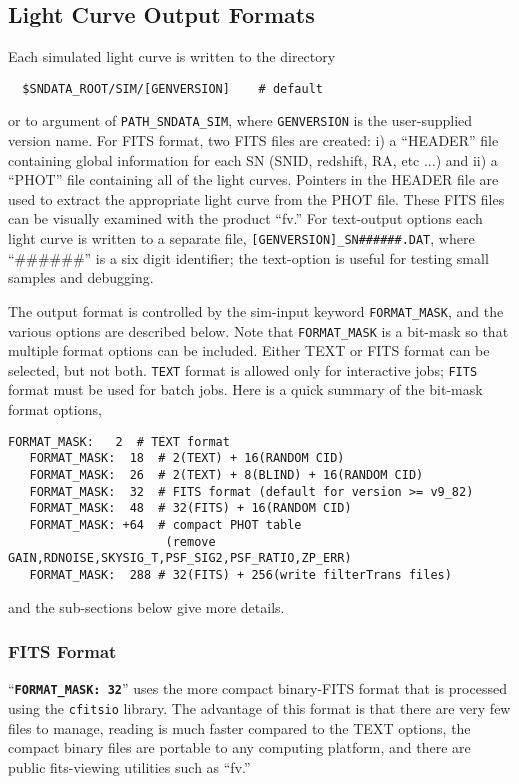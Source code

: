 \documentclass[12pt]{article}
\begin{document}
  \clearpage
   \subsection{Light Curve Output Formats}
   \label{subsec:sim_formats}

Each simulated light curve is written 
to the directory
\begin{verbatim}
  $SNDATA_ROOT/SIM/[GENVERSION]    # default
\end{verbatim}
or to argument of {\tt PATH\_SNDATA\_SIM},
where {\tt GENVERSION} is the user-supplied version name.
For FITS format, two FITS files are created: 
i) a ``HEADER'' file containing global information 
for each SN (SNID, redshift, RA, etc ...) 
and ii) a ``PHOT'' file containing all of the light curves.
Pointers in the HEADER file are used to extract the
appropriate light curve from the PHOT file.
These FITS files can be visually examined with the product ``fv.''
For text-output options each light curve is written to a
separate file, {\tt [GENVERSION]\_SN\#\#\#\#\#\#.DAT},
where ``\#\#\#\#\#\#'' is a six digit identifier;
the text-option is useful for testing small samples and
debugging. 


The output format is controlled by the sim-input keyword
{\tt FORMAT\_MASK}, and the various options are described
below. Note that {\tt FORMAT\_MASK} is a bit-mask so that
multiple format options can be included.
Either TEXT or FITS format can be selected, but not both.
{\tt TEXT} format is allowed only for interactive jobs; 
{\tt FITS} format must be used for batch jobs.
Here is a quick summary of the bit-mask format options,
%

\begin{Verbatim}[frame=single]
   FORMAT_MASK:   2  # TEXT format
   FORMAT_MASK:  18  # 2(TEXT) + 16(RANDOM CID)
   FORMAT_MASK:  26  # 2(TEXT) + 8(BLIND) + 16(RANDOM CID)
   FORMAT_MASK:  32  # FITS format (default for version >= v9_82)
   FORMAT_MASK:  48  # 32(FITS) + 16(RANDOM CID)
   FORMAT_MASK: +64  # compact PHOT table 
                      (remove GAIN,RDNOISE,SKYSIG_T,PSF_SIG2,PSF_RATIO,ZP_ERR)
   FORMAT_MASK:  288 # 32(FITS) + 256(write filterTrans files)
\end{Verbatim}
%
and the sub-sections below give more details.

   \subsubsection{FITS Format}
   \label{sss:fits_format}
``{\tt\bf FORMAT\_MASK:  32}'' 
uses the more compact binary-FITS format 
that is processed using the {\tt cfitsio} library. 
The advantage of this format is that there are very few files
to manage, reading is much faster compared to the TEXT options, 
the compact binary files are portable to any computing platform,
and there are public fits-viewing utilities such as ``fv.''
\end{document}
